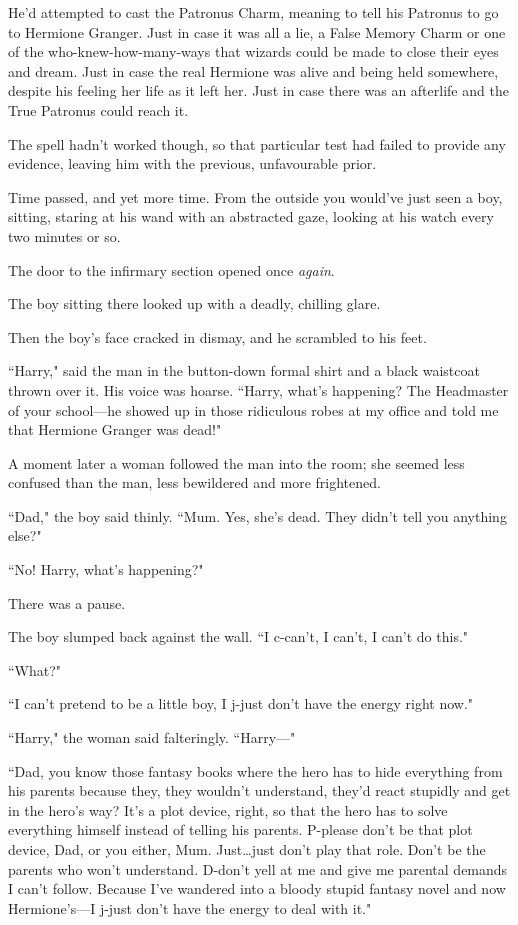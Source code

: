 He'd attempted to cast the Patronus Charm, meaning to tell his Patronus to go to Hermione Granger. Just in case it was all a lie, a False Memory Charm or one of the who-knew-how-many-ways that wizards could be made to close their eyes and dream. Just in case the real Hermione was alive and being held somewhere, despite his feeling her life as it left her. Just in case there was an afterlife and the True Patronus could reach it.

The spell hadn't worked though, so that particular test had failed to provide any evidence, leaving him with the previous, unfavourable prior.

Time passed, and yet more time. From the outside you would've just seen a boy, sitting, staring at his wand with an abstracted gaze, looking at his watch every two minutes or so.

The door to the infirmary section opened once \emph{again}.

The boy sitting there looked up with a deadly, chilling glare.

Then the boy's face cracked in dismay, and he scrambled to his feet.

``Harry," said the man in the button-down formal shirt and a black waistcoat thrown over it. His voice was hoarse. ``Harry, what's happening? The Headmaster of your school—he showed up in those ridiculous robes at my office and told me that Hermione Granger was dead!"

A moment later a woman followed the man into the room; she seemed less confused than the man, less bewildered and more frightened.

``Dad," the boy said thinly. ``Mum. Yes, she's dead. They didn't tell you anything else?"

``No! Harry, what's happening?"

There was a pause.

The boy slumped back against the wall. ``I c-can't, I can't, I can't do this."

``What?"

``I can't pretend to be a little boy, I j-just don't have the energy right now."

``Harry," the woman said falteringly. ``Harry—"

``Dad, you know those fantasy books where the hero has to hide everything from his parents because they, they wouldn't understand, they'd react stupidly and get in the hero's way? It's a plot device, right, so that the hero has to solve everything himself instead of telling his parents. P-please don't be that plot device, Dad, or you either, Mum. Just…just don't play that role. Don't be the parents who won't understand. D-don't yell at me and give me parental demands I can't follow. Because I've wandered into a bloody stupid fantasy novel and now Hermione's—I j-just don't have the energy to deal with it."

